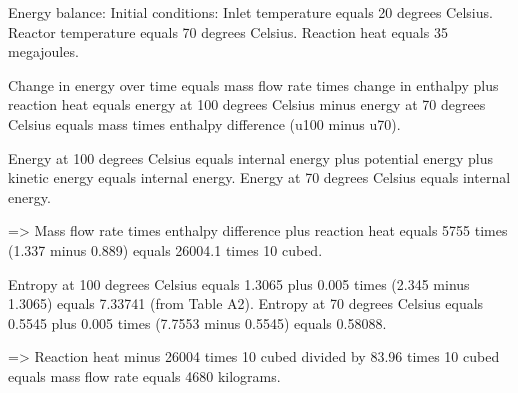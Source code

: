 Energy balance:  
Initial conditions:  
Inlet temperature equals 20 degrees Celsius.  
Reactor temperature equals 70 degrees Celsius.  
Reaction heat equals 35 megajoules.  

Change in energy over time equals mass flow rate times change in enthalpy plus reaction heat equals energy at 100 degrees Celsius minus energy at 70 degrees Celsius equals mass times enthalpy difference (u100 minus u70).  

Energy at 100 degrees Celsius equals internal energy plus potential energy plus kinetic energy equals internal energy.  
Energy at 70 degrees Celsius equals internal energy.  

=> Mass flow rate times enthalpy difference plus reaction heat equals 5755 times (1.337 minus 0.889) equals 26004.1 times 10 cubed.  

Entropy at 100 degrees Celsius equals 1.3065 plus 0.005 times (2.345 minus 1.3065) equals 7.33741 (from Table A2).  
Entropy at 70 degrees Celsius equals 0.5545 plus 0.005 times (7.7553 minus 0.5545) equals 0.58088.  

=> Reaction heat minus 26004 times 10 cubed divided by 83.96 times 10 cubed equals mass flow rate equals 4680 kilograms.
